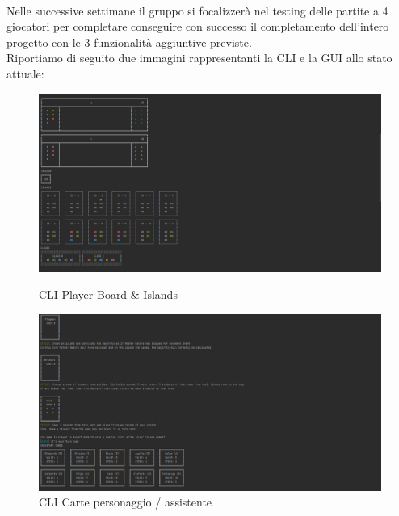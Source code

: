 \documentclass[a4paper, 12pt]{article}
\begin{document}
	\paragraph{}
	Nelle successive settimane il gruppo si focalizzerà nel testing delle partite a 4 giocatori per completare conseguire con successo il completamento dell'intero progetto con le 3 funzionalità aggiuntive previste.\\
	Riportiamo di seguito due immagini rappresentanti la CLI e la GUI allo stato attuale:
	\begin{figure}[!htb]
		\begin{minipage}{0.495\textwidth}
			\centering
			\includegraphics[width=\linewidth]{cliWeek9.png}
			\caption{CLI Player Board \& Islands}
		\end{minipage}\hfill
		\begin{minipage}{0.495\textwidth}
			\centering
			\includegraphics[width=\linewidth]{cli2Week9.png}
			\caption{CLI Carte personaggio / assistente}
		\end{minipage}
	\end{figure}
\end{document}
